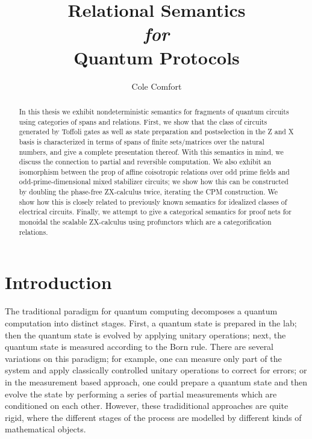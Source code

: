 \documentclass[12pt]{ociamthesis}  %
\title{Relational Semantics \\{ \it \Large for}\\ Quantum Protocols}
\author{Cole Comfort}
\begin{document}
\maketitle


\begin{abstract}
In this thesis we exhibit nondeterministic semantics for fragments of quantum circuits using  categories of spans and relations.  First, we show that the class of circuits generated by Toffoli gates as well as state preparation and postselection in the Z and X basis is characterized in terms of spans of finite sets/matrices over the natural numbers, and give a complete presentation thereof. With this semantics in mind, we discuss the connection to partial and reversible computation. We also exhibit an isomorphism between the prop of affine coisotropic relations over odd prime fields and odd-prime-dimensional mixed stabilizer circuits; we show how this can be constructed by doubling the phase-free ZX-calculus twice, iterating the CPM construction.   We show how this is closely related to previously known semantics for idealized classes of electrical circuits.     Finally, we attempt to give a categorical semantics for proof nets for monoidal the scalable ZX-calculus using profunctors which are a categorification relations.
\end{abstract}


\tableofcontents


\chapter{Introduction}
\label{chap:intro}


The traditional paradigm for quantum computing decomposes a quantum computation into  distinct stages. First, a quantum state is prepared in the lab; then the quantum state is evolved by applying unitary operations; next, the quantum state is measured according to the Born rule.  There are several variations on this paradigm; for example,  one can measure only part of the system and apply classically controlled unitary operations to correct for errors; or in the measurement based approach, one could prepare a quantum state and then evolve the state by performing a series of partial measurements which are conditioned on each other. However, these tradiditional approaches are quite rigid, where the different stages of the process are modelled by different kinds of mathematical objects.  %
\end{document}

